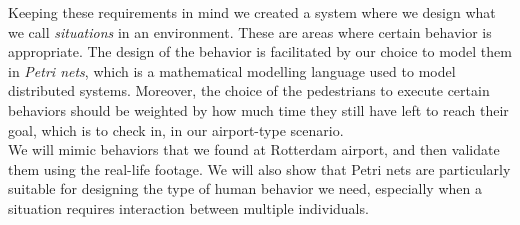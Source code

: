 \documentclass[11pt, a4paper]{book}
\begin{document}
Keeping these requirements in mind we created a system where we design what we call \emph{situations} in an environment. These are areas where certain behavior is appropriate. The design of the behavior is facilitated by our choice to model them in \emph{Petri nets}, which is a mathematical modelling language used to model distributed systems. Moreover, the choice of the pedestrians to execute certain behaviors should be weighted by how much time they still have left to reach their goal, which is to check in, in our airport-type scenario.\\
We will mimic behaviors that we found at Rotterdam airport, and then validate them using the real-life footage. We will also show that Petri nets are particularly suitable for designing the type of human behavior we need, especially when a situation requires interaction between multiple individuals.




\end{document}

